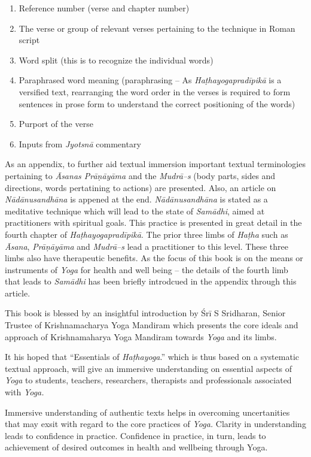 \begin{enumerate}
\item Reference number (verse and chapter number)
\item The verse or group of relevant verses pertaining to the technique in Roman script 
\item Word split (this is to recognize the individual words)
\item Paraphrased word meaning (paraphrasing – As \textit{Haṭhayogapradīpikā} is a versified text, rearranging the word order in the verses is required to form sentences in prose form to understand the correct positioning of the words)
\item Purport of the verse 
\item Inputs from \textit{Jyotsnā} commentary
\end{enumerate}

As an appendix, to further aid textual immersion important textual terminologies pertaining to \textit{Āsanas Prāṇāyāma} and the \textit{Mudrā–s} (body parts, sides and directions, words pertatining to actions) are presented. Also, an article on \textit{Nādānusandhāna} is appened at the end. \textit{Nādānusandhāna} is stated as a meditative technique which will lead to the state of \textit{Samādhi}, aimed at practitioners with spiritual goals. This practice is presented in great detail in the fourth chapter of \textit{Haṭhayogapradīpikā}. The prior three limbs of \textit{Haṭha} such as \textit{Āsana}, \textit{Prāṇāyāma} and \textit{Mudrā–s} lead a practitioner to this level. These three limbs also have therapeutic benefits. As the focus of this book is on the means or instruments of \textit{Yoga} for health and well being – the details of the fourth limb that leads to \textit{Samādhi} has been briefly introdcued in the appendix through this article.

This book is blessed by an insightful introduction by Śrī S Sridharan, Senior Trustee of Krishnamacharya Yoga Mandiram which presents the core ideals and approach of Krishnamaharya Yoga Mandiram towards \textit{Yoga} and its limbs.

It his hoped that “Essentials of \textit{Haṭhayoga}.” which is thus based on a systematic textual approach, will give an immersive understanding on essential aspects of \textit{Yoga} to students, teachers, researchers, therapists and professionals associated with \textit{Yoga.}

Immersive understanding of authentic texts helps in overcoming uncertanities that may exsit with regard to the core practices of \textit{Yoga.} Clarity in understanding leads to confidence in practice. Confidence in practice, in turn, leads to achievement of desired outcomes in health and wellbeing through Yoga. 

